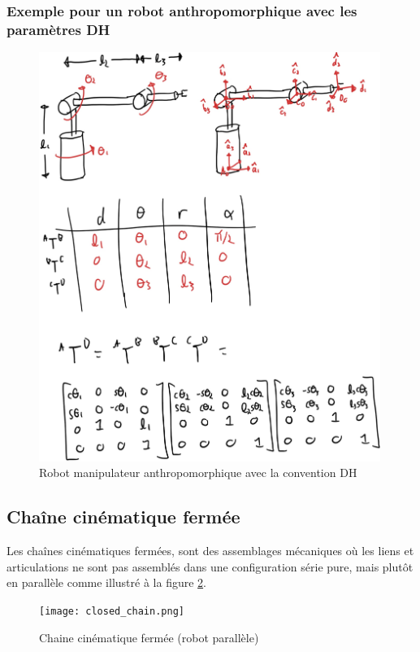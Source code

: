 \newpage
\subsubsection{Exemple pour un robot anthropomorphique avec les paramètres DH}

\begin{figure}[H]
	\centering
		\includegraphics[width=0.99\textwidth]{fig/dh3.jpg}
	\caption{Robot manipulateur anthropomorphique avec la convention DH}
	\label{fig:dh3}
\end{figure}










\newpage
\subsection{Chaîne cinématique fermée}

Les chaînes cinématiques fermées, sont des assemblages mécaniques où les liens et articulations ne sont pas assemblés dans une configuration série pure, mais plutôt en parallèle comme illustré à la figure \ref{fig:closed_chain}.
\begin{figure}[H]
	\centering
		\texttt{[image: closed\_chain.png]}
	\caption{Chaine cinématique fermée (robot parallèle)}
	\label{fig:closed_chain}
\end{figure}

